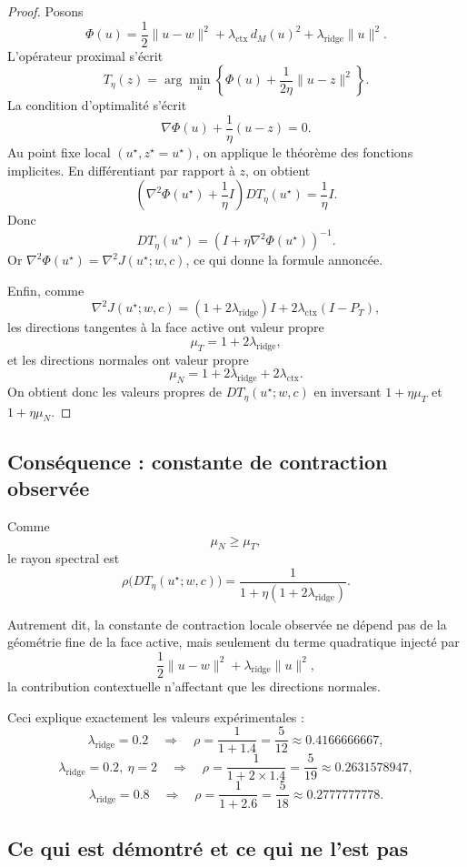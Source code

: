 \begin{proof}
Posons
\[
\Phi(u)=\frac12\|u-w\|^2+\lambda_{\mathrm{ctx}}\,d_M(u)^2+\lambda_{\mathrm{ridge}}\|u\|^2.
\]
L'opérateur proximal s'écrit
\[
T_\eta(z)=\arg\min_u\left\{\Phi(u)+\frac1{2\eta}\|u-z\|^2\right\}.
\]
La condition d'optimalité s'écrit
\[
\nabla\Phi(u)+\frac1\eta(u-z)=0.
\]
Au point fixe local $(u^\star,z^\star=u^\star)$, on applique le théorème des fonctions implicites. En différentiant par rapport à $z$, on obtient
\[
\left(\nabla^2\Phi(u^\star)+\frac1\eta I\right)DT_\eta(u^\star)
=
\frac1\eta I.
\]
Donc
\[
DT_\eta(u^\star)
=
\left(I+\eta\nabla^2\Phi(u^\star)\right)^{-1}.
\]
Or $\nabla^2\Phi(u^\star)=\nabla^2J(u^\star;w,c)$, ce qui donne la formule annoncée.

Enfin, comme
\[
\nabla^2J(u^\star;w,c)
=
(1+2\lambda_{\mathrm{ridge}})I+2\lambda_{\mathrm{ctx}}(I-P_T),
\]
les directions tangentes à la face active ont valeur propre
\[
\mu_T=1+2\lambda_{\mathrm{ridge}},
\]
et les directions normales ont valeur propre
\[
\mu_N=1+2\lambda_{\mathrm{ridge}}+2\lambda_{\mathrm{ctx}}.
\]
On obtient donc les valeurs propres de $DT_\eta(u^\star;w,c)$ en inversant $1+\eta\mu_T$ et $1+\eta\mu_N$.
\end{proof}

\subsection{Conséquence : constante de contraction observée}

Comme
\[
\mu_N\ge \mu_T,
\]
le rayon spectral est
\[
\rho\bigl(DT_\eta(u^\star;w,c)\bigr)
=
\frac1{1+\eta(1+2\lambda_{\mathrm{ridge}})}.
\]

Autrement dit, la constante de contraction locale observée ne dépend pas de la géométrie fine de la face active, mais seulement du terme quadratique injecté par
\[
\frac12\|u-w\|^2+\lambda_{\mathrm{ridge}}\|u\|^2,
\]
la contribution contextuelle n'affectant que les directions normales.

Ceci explique exactement les valeurs expérimentales :
\[
\lambda_{\mathrm{ridge}}=0.2 \quad\Longrightarrow\quad
\rho=\frac1{1+1.4}=\frac5{12}\approx 0.4166666667,
\]
\[
\lambda_{\mathrm{ridge}}=0.2,\ \eta=2 \quad\Longrightarrow\quad
\rho=\frac1{1+2\times 1.4}=\frac5{19}\approx 0.2631578947,
\]
\[
\lambda_{\mathrm{ridge}}=0.8 \quad\Longrightarrow\quad
\rho=\frac1{1+2.6}=\frac5{18}\approx 0.2777777778.
\]

\subsection{Ce qui est démontré et ce qui ne l'est pas}

